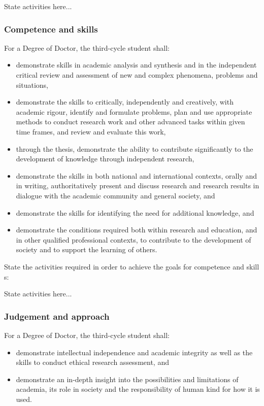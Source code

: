 \colorbox{lgray}{
\begin{minipage}[t]{\textwidth}

State activities here...

\end{minipage}}

\subsubsection*{Competence and skills}
For a Degree of Doctor, the third-cycle student shall:
\begin{itemize}
	\item demonstrate skills in academic analysis and synthesis and in the independent critical review and assessment of new and complex phenomena, problems and situations,
	\item demonstrate the skills to critically, independently and creatively, with academic rigour, identify and formulate problems, plan and use appropriate methods to conduct research work and other advanced tasks within given time frames, and review and evaluate this work,
	\item through the thesis, demonstrate the ability to contribute significantly to the development of knowledge through independent research,
	\item demonstrate the skills in both national and international contexts, orally and in writing, authoritatively present and discuss research and research results in dialogue with the academic community and general society, and
	\item demonstrate the skills for identifying the need for additional knowledge, and
\item demonstrate the conditions required both within research and education, and in other qualified professional contexts, to contribute to the development of society and to support the learning of others.
\end{itemize}

State the activities required in order to achieve the goals for competence and skill
s:

\colorbox{lgray}{
\begin{minipage}[t]{\textwidth}

State activities here...

\end{minipage}}

\subsubsection*{Judgement and approach}
For a Degree of Doctor, the third-cycle student shall:
\begin{itemize}
	\item demonstrate intellectual independence and academic integrity as well as the skills to conduct ethical research assessment, and
	\item demonstrate an in-depth insight into the possibilities and limitations of academia, its role in society and the responsibility of human kind for how it is used.
\end{itemize}

